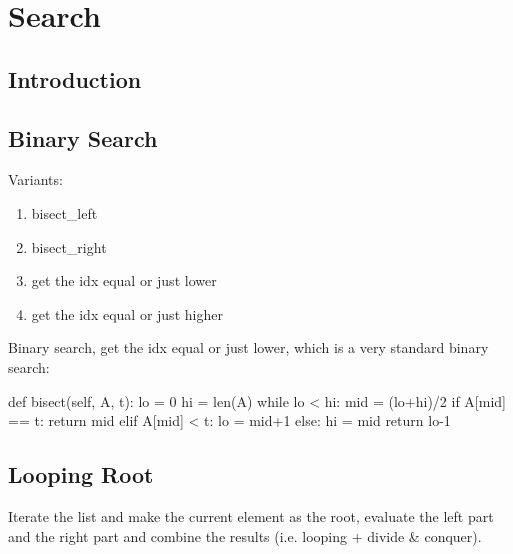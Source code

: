 \chapter{Search}


\section{Introduction}

\section{Binary Search}
Variants:
\begin{enumerate}
\item bisect\_left
\item bisect\_right
\item get the idx equal or just lower 
\item get the idx equal or just higher 
\end{enumerate}
Binary search, get the idx equal or just lower, which is a very standard binary search:
\begin{python}
def bisect(self, A, t):
    lo = 0
    hi = len(A)
    while lo < hi:
        mid = (lo+hi)/2
        if A[mid] == t:
            return mid
        elif A[mid] < t:
            lo = mid+1
        else:
            hi = mid
    return lo-1
\end{python}

\section{Looping Root}
Iterate the list and make the current element as the root, evaluate the left part and the right part and combine the results (i.e. looping + divide \& conquer). 
